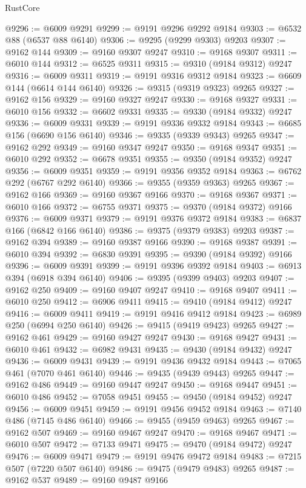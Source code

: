 \begin{lexlean}{RustCore}
\begin{coremodule}
@9296 := @6009 @9291
@9299 := @9191 @9296 @9292 @9184
@9303 := @6532 @88 (@6537 @88 @6140)
@9306 := @9295 (@9299 @9303) @9203
@9307 := @9162 @144
@9309 := @9160 @9307 @9247
@9310 := @9168 @9307
@9311 := @6010 @144
@9312 := @6525 @9311
@9315 := @9310 (@9184 @9312) @9247
@9316 := @6009 @9311
@9319 := @9191 @9316 @9312 @9184
@9323 := @6609 @144 (@6614 @144 @6140)
@9326 := @9315 (@9319 @9323) @9265
@9327 := @9162 @156
@9329 := @9160 @9327 @9247
@9330 := @9168 @9327
@9331 := @6010 @156
@9332 := @6602 @9331
@9335 := @9330 (@9184 @9332) @9247
@9336 := @6009 @9331
@9339 := @9191 @9336 @9332 @9184
@9343 := @6685 @156 (@6690 @156 @6140)
@9346 := @9335 (@9339 @9343) @9265
@9347 := @9162 @292
@9349 := @9160 @9347 @9247
@9350 := @9168 @9347
@9351 := @6010 @292
@9352 := @6678 @9351
@9355 := @9350 (@9184 @9352) @9247
@9356 := @6009 @9351
@9359 := @9191 @9356 @9352 @9184
@9363 := @6762 @292 (@6767 @292 @6140)
@9366 := @9355 (@9359 @9363) @9265
@9367 := @9162 @166
@9369 := @9160 @9367 @9166
@9370 := @9168 @9367
@9371 := @6010 @166
@9372 := @6755 @9371
@9375 := @9370 (@9184 @9372) @9166
@9376 := @6009 @9371
@9379 := @9191 @9376 @9372 @9184
@9383 := @6837 @166 (@6842 @166 @6140)
@9386 := @9375 (@9379 @9383) @9203
@9387 := @9162 @394
@9389 := @9160 @9387 @9166
@9390 := @9168 @9387
@9391 := @6010 @394
@9392 := @6830 @9391
@9395 := @9390 (@9184 @9392) @9166
@9396 := @6009 @9391
@9399 := @9191 @9396 @9392 @9184
@9403 := @6913 @394 (@6918 @394 @6140)
@9406 := @9395 (@9399 @9403) @9203
@9407 := @9162 @250
@9409 := @9160 @9407 @9247
@9410 := @9168 @9407
@9411 := @6010 @250
@9412 := @6906 @9411
@9415 := @9410 (@9184 @9412) @9247
@9416 := @6009 @9411
@9419 := @9191 @9416 @9412 @9184
@9423 := @6989 @250 (@6994 @250 @6140)
@9426 := @9415 (@9419 @9423) @9265
@9427 := @9162 @461
@9429 := @9160 @9427 @9247
@9430 := @9168 @9427
@9431 := @6010 @461
@9432 := @6982 @9431
@9435 := @9430 (@9184 @9432) @9247
@9436 := @6009 @9431
@9439 := @9191 @9436 @9432 @9184
@9443 := @7065 @461 (@7070 @461 @6140)
@9446 := @9435 (@9439 @9443) @9265
@9447 := @9162 @486
@9449 := @9160 @9447 @9247
@9450 := @9168 @9447
@9451 := @6010 @486
@9452 := @7058 @9451
@9455 := @9450 (@9184 @9452) @9247
@9456 := @6009 @9451
@9459 := @9191 @9456 @9452 @9184
@9463 := @7140 @486 (@7145 @486 @6140)
@9466 := @9455 (@9459 @9463) @9265
@9467 := @9162 @507
@9469 := @9160 @9467 @9247
@9470 := @9168 @9467
@9471 := @6010 @507
@9472 := @7133 @9471
@9475 := @9470 (@9184 @9472) @9247
@9476 := @6009 @9471
@9479 := @9191 @9476 @9472 @9184
@9483 := @7215 @507 (@7220 @507 @6140)
@9486 := @9475 (@9479 @9483) @9265
@9487 := @9162 @537
@9489 := @9160 @9487 @9166

\end{coremodule}
\end{lexlean}
